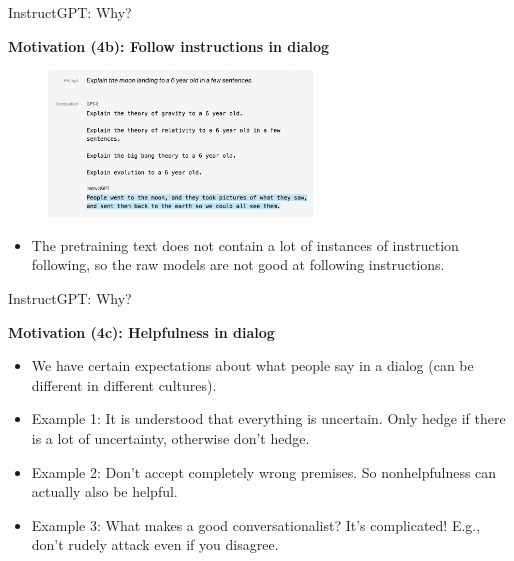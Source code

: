 \begin{vbframe}{InstructGPT: Why?}

\vfill

\textbf{Motivation (4b): Follow instructions in dialog}


\vfill

\begin{figure}
\centering
\includegraphics[width = 7cm]{figure/moon6yearold.png}
\end{figure}

\begin{itemize}
	\item The pretraining text does not contain a lot of
	instances of instruction following, so the raw
	models are not good at following instructions.
\end{itemize}



\vfill

\end{vbframe}





\begin{vbframe}{InstructGPT: Why?}

\vfill

\textbf{Motivation (4c): Helpfulness in dialog}

	\begin{itemize}
		\item We have certain expectations about
		what people say in a dialog (can be
		different in different cultures). 
		\item Example 1: It is understood that
		everything is uncertain. Only hedge if there
		is a lot of uncertainty, otherwise don't hedge.
                \item Example 2: Don't
		accept completely wrong premises. So
		nonhelpfulness can actually also be helpful.
		\item Example 3: What makes a good
		conversationalist? It's complicated! E.g.,
                don't rudely attack even
		if you disagree.
	\end{itemize}

\vfill

\end{vbframe}

